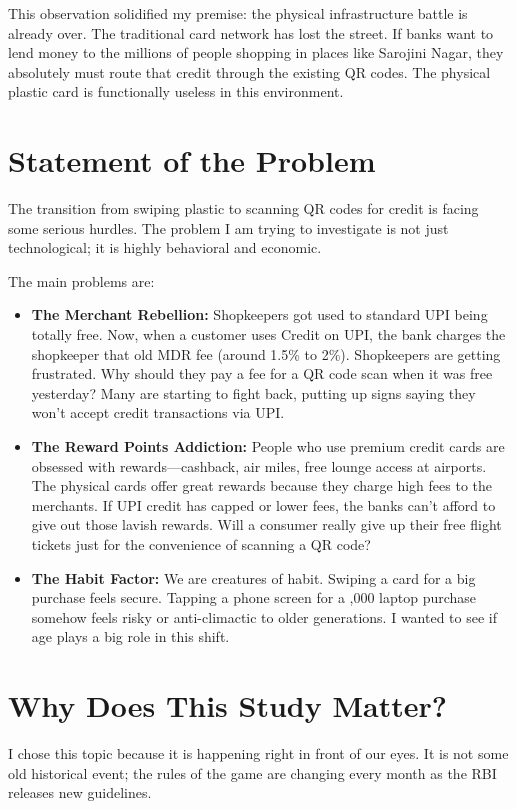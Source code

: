 This observation solidified my premise: the physical infrastructure battle is already over. The traditional card network has lost the street. If banks want to lend money to the millions of people shopping in places like Sarojini Nagar, they absolutely must route that credit through the existing QR codes. The physical plastic card is functionally useless in this environment.

\section{Statement of the Problem}

The transition from swiping plastic to scanning QR codes for credit is facing some serious hurdles. The problem I am trying to investigate is not just technological; it is highly behavioral and economic.

The main problems are:
\begin{itemize}
    \item \textbf{The Merchant Rebellion:} Shopkeepers got used to standard UPI being totally free. Now, when a customer uses Credit on UPI, the bank charges the shopkeeper that old MDR fee (around 1.5\% to 2\%). Shopkeepers are getting frustrated. Why should they pay a fee for a QR code scan when it was free yesterday? Many are starting to fight back, putting up signs saying they won't accept credit transactions via UPI.
    \item \textbf{The Reward Points Addiction:} People who use premium credit cards are obsessed with rewards---cashback, air miles, free lounge access at airports. The physical cards offer great rewards because they charge high fees to the merchants. If UPI credit has capped or lower fees, the banks can't afford to give out those lavish rewards. Will a consumer really give up their free flight tickets just for the convenience of scanning a QR code?
    \item \textbf{The Habit Factor:} We are creatures of habit. Swiping a card for a big purchase feels secure. Tapping a phone screen for a ,000 laptop purchase somehow feels risky or anti-climactic to older generations. I wanted to see if age plays a big role in this shift.
\end{itemize}

\section{Why Does This Study Matter?}

I chose this topic because it is happening right in front of our eyes. It is not some old historical event; the rules of the game are changing every month as the RBI releases new guidelines.

